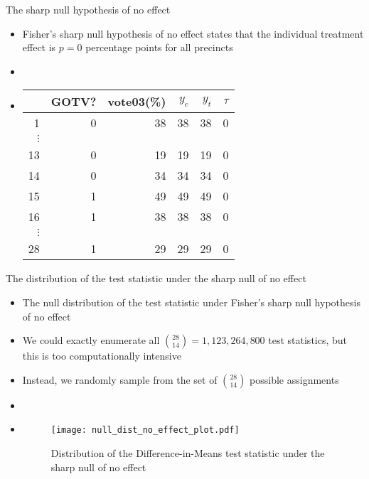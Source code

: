 \documentclass[table, xcolor={dvipsnames}, 9pt]{beamer}
\theoremstyle{newstyle}
\begin{document}
\begin{frame}{The sharp null hypothesis of no effect}
\begin{itemize}
\item Fisher's sharp null hypothesis of no effect states that the individual treatment effect is $p = 0$ percentage points for all precincts \pause 
\item[]
\item[]
\begin{center}
  \begin{tabular}{r|rr|rrr}
  \hline
 & GOTV? & vote03(\%)& $y_c$ & $y_t$ & $\tau$\\
  \hline
1 & 0 & 38 & 38 & 38 & 0 \\
$\vdots$& & & & & \\
13 & 0 & 19 & 19 & 19 & 0 \\
14 & 0 & 34 & 34 & 34 & 0 \\
15 & 1 & 49 & 49 & 49 & 0 \\
16 & 1 & 38 & 38 & 38 & 0 \\
$\vdots$& & & & & \\
28 & 1 & 29 & 29 & 29 & 0 \\
   \hline
\end{tabular}
\end{center}
\end{itemize}
\end{frame}
\begin{frame}{The distribution of the test statistic under the sharp null of no effect}
\begin{itemize}
\item The null distribution of the test statistic under Fisher's sharp null hypothesis of no effect \pause 
\item We could exactly enumerate all $\binom{28}{14} = 1,123,264,800$ test statistics, but this is too computationally intensive \pause 
\item Instead, we randomly sample from the set of $\binom{28}{14}$ possible assignments \pause 
\item[]
\item[]
\begin{figure}[H]
\texttt{[image: null\_dist\_no\_effect\_plot.pdf]}
\caption{Distribution of the Difference-in-Means test statistic under the sharp null of no effect}
\end{figure}
\end{itemize}
\end{frame}
\end{document}
